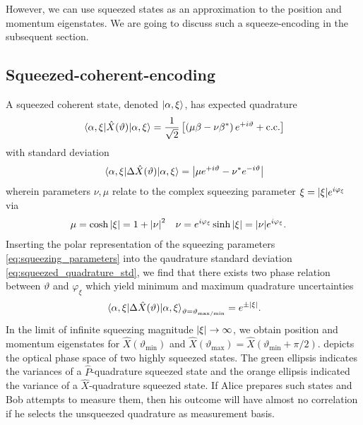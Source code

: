 However, we can use squeezed states as an approximation to the position and momentum eigenstates.
We are going to discuss such a squeeze-encoding in the subsequent section.

\FloatBarrier
\subsection{Squeezed-coherent-encoding}

A squeezed coherent state, denoted $\ket{\alpha,\xi}$, has expected quadrature~\cite[p.~91,94]{Vogel2006}
\begin{equation}
	\expval{\hat{X}(\vartheta)}{\alpha,\xi}
	=
	\frac{1}{\sqrt{2}}
	\left[
		\left(\mu\beta-\nu\beta^*\right)
		e^{+i\vartheta}
		+
		\text{c.c.}
	\right]
\end{equation}
with standard deviation~\cite[p.~95]{Vogel2006}
\begin{equation}
	\expval{\Delta\hat{X}(\vartheta)}{\alpha,\xi}
	=
	\abs{\mu e^{+i\vartheta}-\nu^* e^{-i\vartheta}}
	\label{eq:squeezed_quadrature_std}
\end{equation}
wherein parameters $\nu,\mu$ relate to the complex squeezing parameter $\xi=\abs{\xi}e^{i\varphi_\xi}$ via~\cite[p.~90]{Vogel2006}
\begin{align}
	\mu
	&=
	\cosh\abs{\xi}
	=
	1+\abs{\nu}^2
	&
	\nu
	&=
	e^{i\varphi_\xi}
	\sinh\abs{\xi}
	=
	\abs{\nu}
	e^{i\varphi_\xi}
	\label{eq:squeezing_parameters}
	.
\end{align}
Inserting the polar representation of the squeezing parameters \cref{eq:squeezing_parameters} into the qaudrature standard deviation \cref{eq:squeezed_quadrature_std}, we find that there exists two phase relation between $\vartheta$ and $\varphi_\xi$ which yield minimum and maximum quadrature uncertainties~\cite[p.~96]{Vogel2006}
\begin{equation}
	\expval{\Delta\hat{X}(\vartheta)}{\alpha,\xi}_{\vartheta=\vartheta_{\text{max}/\text{min}}}
	=
	e^{\pm\abs{\xi}}
	.
\end{equation}
In the limit of infinite squeezing magnitude $\abs{\xi}\to\infty$, we obtain position and momentum eigenstates for $\hat{X}(\vartheta_\text{min})$ and $\hat{X}(\vartheta_\text{max})=\hat{X}(\vartheta_\text{min}+\pi/2)$.
 depicts the optical phase space of two highly squeezed states.
The green ellipsis indicates the variances of a $\hat{P}$-quadrature squeezed state and the orange ellipsis indicated the variance of a $\hat{X}$-quadrature squeezed state.
If Alice prepares such states and Bob attempts to measure them, then his outcome will have almost no correlation if he selects the unsqueezed quadrature as measurement basis.
